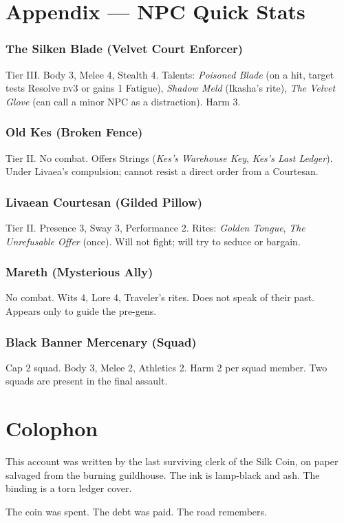 \documentclass[10pt,twoside]{book}
\newcommand{\dv}{\textsc{dv}}
\begin{document}
\chapter{Appendix --- NPC Quick Stats}

\subsection{The Silken Blade (Velvet Court Enforcer)}
Tier III. Body 3, Melee 4, Stealth 4. Talents: \textit{Poisoned Blade} (on a hit, target tests Resolve \dv 3 or gains 1 Fatigue), \textit{Shadow Meld} (Ikasha's rite), \textit{The Velvet Glove} (can call a minor NPC as a distraction). Harm 3.

\subsection{Old Kes (Broken Fence)}
Tier II. No combat. Offers Strings (\textit{Kes's Warehouse Key}, \textit{Kes's Last Ledger}). Under Livaea's compulsion; cannot resist a direct order from a Courtesan.

\subsection{Livaean Courtesan (Gilded Pillow)}
Tier II. Presence 3, Sway 3, Performance 2. Rites: \textit{Golden Tongue}, \textit{The Unrefusable Offer} (once). Will not fight; will try to seduce or bargain.

\subsection{Mareth (Mysterious Ally)}
No combat. Wits 4, Lore 4, Traveler's rites. Does not speak of their past. Appears only to guide the pre-gens.

\subsection{Black Banner Mercenary (Squad)}
Cap 2 squad. Body 3, Melee 2, Athletics 2. Harm 2 per squad member. Two squads are present in the final assault.

\chapter{Colophon}

This account was written by the last surviving clerk of the Silk Coin, on paper salvaged from the burning guildhouse. The ink is lamp-black and ash. The binding is a torn ledger cover.

The coin was spent. The debt was paid. The road remembers.
\end{document}
